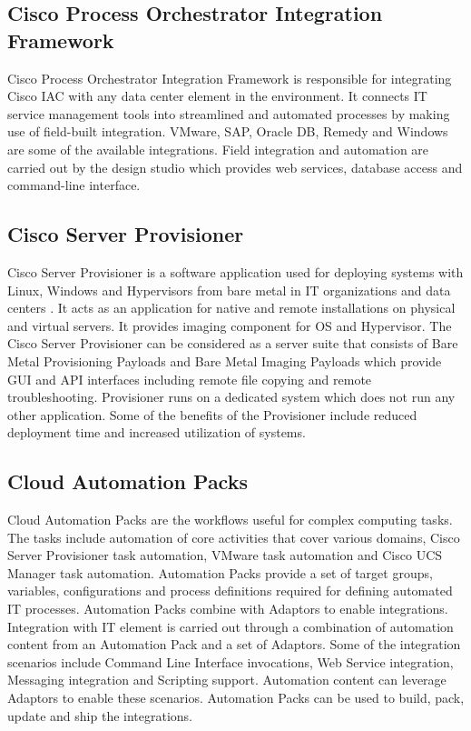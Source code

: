 \documentclass[9pt,twocolumn,twoside]{../../styles/osajnl}
\begin{document}
\subsection{Cisco Process Orchestrator Integration Framework}

Cisco Process Orchestrator Integration Framework is responsible for
integrating Cisco IAC with any data center element in the
environment. It connects IT service management tools into streamlined
and automated processes by making use of field-built
integration. VMware, SAP, Oracle DB, Remedy and Windows are some of
the available integrations. Field integration and automation are
carried out by the design studio which provides web services, database
access and command-line interface.

\subsection{Cisco Server Provisioner}

Cisco Server Provisioner is a software application used for deploying
systems with Linux, Windows and Hypervisors from bare metal in IT
organizations and data centers \cite{cisco-provisioner}. It acts as an
application for native and remote installations on physical and
virtual servers. It provides imaging component for OS and
Hypervisor. The Cisco Server Provisioner can be considered as a server
suite that consists of Bare Metal Provisioning Payloads and Bare Metal
Imaging Payloads which provide GUI and API interfaces including remote
file copying and remote troubleshooting. Provisioner runs on a
dedicated system which does not run any other application. Some of the
benefits of the Provisioner include reduced deployment time and
increased utilization of systems.

\subsection{Cloud Automation Packs}

Cloud Automation Packs are the workflows useful for complex computing
tasks. The tasks include automation of core activities that cover
various domains, Cisco Server Provisioner task automation, VMware task
automation and Cisco UCS Manager task automation. Automation Packs
provide a set of target groups, variables, configurations and process
definitions required for defining automated IT processes. Automation
Packs combine with Adaptors to enable integrations. Integration with
IT element is carried out through a combination of automation content
from an Automation Pack and a set of Adaptors. Some of the integration
scenarios include Command Line Interface invocations, Web Service
integration, Messaging integration and Scripting support. Automation
content can leverage Adaptors to enable these scenarios. Automation
Packs can be used to build, pack, update and ship the integrations.
\end{document}
